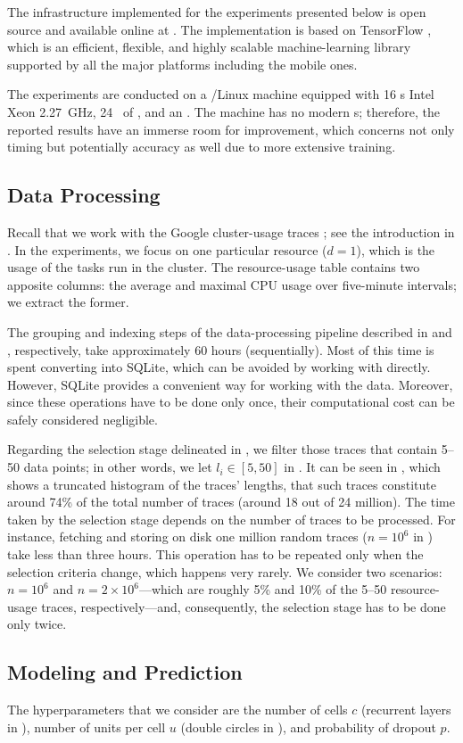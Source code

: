 The infrastructure implemented for the experiments presented below is open
source and available online at \cite{sources}. The implementation is based on
TensorFlow \cite{abadi2015}, which is an efficient, flexible, and highly
scalable machine-learning library supported by all the major platforms including
the mobile ones.

The experiments are conducted on a /Linux machine equipped with 16
s Intel Xeon  2.27~GHz, 24~ of , and an
. The machine has no modern s; therefore, the reported results
have an immerse room for improvement, which concerns not only timing but
potentially accuracy as well due to more extensive training.

\subsection{Data Processing}
Recall that we work with the Google cluster-usage traces \cite{reiss2011}; see
the introduction in . In the experiments, we focus on one particular
resource ($d = 1$), which is the  usage of the tasks run in the cluster.
The resource-usage table contains two apposite columns: the average and maximal
CPU usage over five-minute intervals; we extract the former.

The grouping and indexing steps of the data-processing pipeline described in
 and , respectively, take approximately 60 hours
(sequentially). Most of this time is spent converting  into SQLite,
which can be avoided by working with  directly. However, SQLite provides
a convenient way for working with the data. Moreover, since these operations
have to be done only once, their computational cost can be safely considered
negligible.


Regarding the selection stage delineated in , we filter those
traces that contain 5--50 data points; in other words, we let $l_i \in [5, 50]$
in . It can be seen in , which shows a truncated
histogram of the traces' lengths, that such traces constitute around 74\% of the
total number of traces (around 18 out of 24 million). The time taken by the
selection stage depends on the number of traces to be processed. For instance,
fetching and storing on disk one million random traces ($n = 10^6$ in
) take less than three hours. This operation has to be repeated
only when the selection criteria change, which happens very rarely. We
consider two scenarios: $n = 10^6$ and $n = 2 \times 10^6$---which are roughly
5\% and 10\% of the 5--50 resource-usage traces, respectively---and,
consequently, the selection stage has to be done only twice.

\subsection{Modeling and Prediction}
The hyperparameters that we consider are the number of cells $c$ (recurrent
layers in ), number of units per cell $u$ (double circles in
), and probability of dropout $p$.
